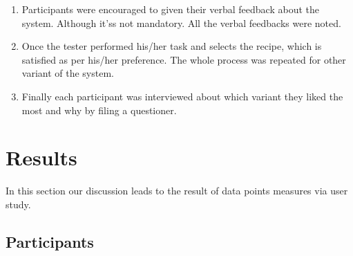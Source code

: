 \begin{enumerate}
 	\item Participants were encouraged to given their verbal feedback about the system. Although it'ss not mandatory. All the verbal feedbacks were noted. 
 	
 	\item Once the tester performed his/her task and selects the recipe, which is satisfied as per his/her preference. The whole process was repeated for other variant of the system. 
	\item Finally each participant was interviewed about which  variant they liked the most and why by filing a questioner. 
 \end{enumerate}
 
\section{Results}
In this section our discussion leads to the result of data points measures via user study.  

\subsection {Participants}

